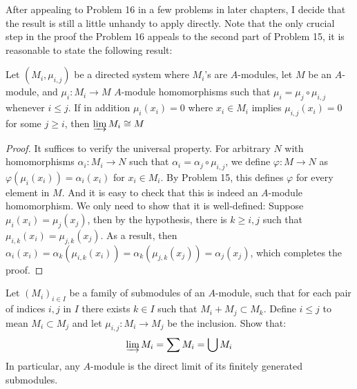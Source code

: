 \documentclass{solution}
\begin{document}
{\color{red} After appealing to Problem 16 in a few problems in later chapters, I decide that the result is still a little unhandy to apply directly. Note that the only crucial step in the proof the Problem 16 appeals to the second part of Problem 15, it is reasonable to state the following result:}

\begin{proposition}
    Let $(M_i, \mu_{i, j})$ be a directed system where $M_i$'s are $A$-modules, let $M$ be an $A$-module, and $\mu_i: M_i \rightarrow M$ $A$-module homomorphisms such that $\mu_i = \mu_j \circ \mu_{i, j}$ whenever $i \le j$. If in addition $\mu_i(x_i) = 0$ where $x_i \in M_i$ implies $\mu_{i, j} (x_i) = 0$ for some $j \ge i$, then $\varinjlim M_i \cong M$
\end{proposition}

\begin{proof}
    It suffices to verify the universal property. For arbitrary $N$ with homomorphisms $\alpha_i: M_i \rightarrow N$ such that $\alpha_i = \alpha_j \circ \mu_{i, j}$, we define $\varphi: M \rightarrow N$ as $\varphi(\mu_i(x_i)) = \alpha_i(x_i)$ for $x_i \in M_i$. By Problem 15, this defines $\varphi$ for every element in $M$. And it is easy to check that this is indeed an $A$-module homomorphism. We only need to show that it is well-defined: Suppose $\mu_i(x_i) = \mu_j(x_j)$, then by the hypothesis, there is $k \ge i, j$ such that $\mu_{i, k} (x_i) = \mu_{j, k}(x_j)$. As a result, then $\alpha_i(x_i) = \alpha_k(\mu_{i, k}(x_i)) = \alpha_k(\mu_{j, k}(x_j)) = \alpha_j (x_j)$, which completes the proof.
\end{proof}

\begin{problem}
    Let $(M_i)_{i \in I}$ be a family of submodules of an $A$-module, such that for each pair of indices $i, j$ in $I$ there exists $k \in I$ such that $M_i + M_j \subset M_k$. Define $i \le j$ to mean $M_i \subset M_j$ and let $\mu_{i, j}:M_i \rightarrow M_j$ be the inclusion. Show that:
    $$\varinjlim M_i = \sum M_i = \bigcup M_i$$
    In particular, any $A$-module is the direct limit of its finitely generated submodules.
\end{problem}
\end{document}
